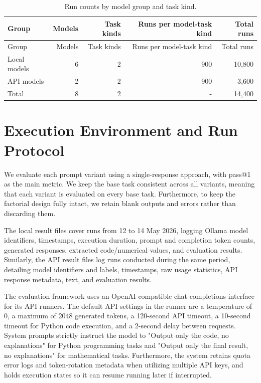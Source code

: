 \begin{longtable}[]{@{}lrrrr@{}}
\caption{Run counts by model group and task kind.}\label{tab:run-counts}\tabularnewline
\toprule\noalign{}
Group & Models & Task kinds & Runs per model-task kind & Total runs \\
\midrule\noalign{}
\endfirsthead
\toprule\noalign{}
Group & Models & Task kinds & Runs per model-task kind & Total runs \\
\midrule\noalign{}
\endhead
\bottomrule\noalign{}
\endlastfoot
Local models & 6 & 2 & 900 & 10,800 \\
API models & 2 & 2 & 900 & 3,600 \\
Total & 8 & 2 & - & 14,400 \\
\end{longtable}

\section{Execution Environment and Run Protocol\label{sec:execution-environment}}

We evaluate each prompt variant using a single-response approach, with pass@1 as the main metric. We keep the base task consistent across all variants, meaning that each variant is evaluated on every base task. Furthermore, to keep the factorial design fully intact, we retain blank outputs and errors rather than discarding them.

The local result files cover runs from 12 to 14 May 2026, logging Ollama model identifiers, timestamps, execution duration, prompt and completion token counts, generated responses, extracted code/numerical values, and evaluation results. Similarly, the API result files log runs conducted during the same period, detailing model identifiers and labels, timestamps, raw usage statistics, API response metadata, text, and evaluation results.

The evaluation framework uses an OpenAI-compatible chat-completions interface for its API runners. The default API settings in the runner are a temperature of 0, a maximum of 2048 generated tokens, a 120-second API timeout, a 10-second timeout for Python code execution, and a 2-second delay between requests. System prompts strictly instruct the model to "Output only the code, no explanations" for Python programming tasks and "Output only the final result, no explanations" for mathematical tasks. Furthermore, the system retains quota error logs and token-rotation metadata when utilizing multiple API keys, and holds execution states so it can resume running later if interrupted.

